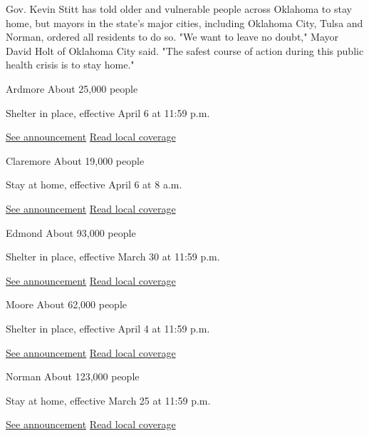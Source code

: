 Gov. Kevin Stitt has told older and vulnerable people across Oklahoma to
stay home, but mayors in the state's major cities, including Oklahoma
City, Tulsa and Norman, ordered all residents to do so. "We want to
leave no doubt," Mayor David Holt of Oklahoma City said. "The safest
course of action during this public health crisis is to stay home."

Ardmore About 25,000 people

Shelter in place, effective April 6 at 11:59 p.m.

\href{https://www.ardmorecity.org/DocumentCenter/View/2193/emergency-resolution?bidId=}{See
announcement} \textbar{}
\href{http://www.kten.com/story/41982515/ardmore-residents-ordered-to-shelter-in-place}{Read
local coverage}

Claremore About 19,000 people

Stay at home, effective April 6 at 8 a.m.

\href{https://www.claremorecity.com/DocumentCenter/View/4999/Emergency-Management-Order-3}{See
announcement} \textbar{}
\href{https://ktul.com/news/local/claremore-issues-stay-at-home-order}{Read
local coverage}

Edmond About 93,000 people

Shelter in place, effective March 30 at 11:59 p.m.

\href{http://edmondok.com/1568/COVID-19-Coronavirus-Information}{See
announcement} \textbar{}
\href{https://www.edmondsun.com/news/shelter-in-place-close-non-essential-businesses-in-edmond/article_9351d77a-72ec-11ea-baf9-efe3ccd9894e.html}{Read
local coverage}

Moore About 62,000 people

Shelter in place, effective April 4 at 11:59 p.m.

\href{https://www.cityofmoore.com/uploads/Parks/EMERGENCY-PROCLAMATION-00382020.pdf}{See
announcement} \textbar{}
\href{https://www.normantranscript.com/news/local_news/moore-issues-shelter-in-place-order-schools-update-distance-learning/article_e429efb1-025d-54ea-bc4c-d5afbcf1799f.html}{Read
local coverage}

Norman About 123,000 people

Stay at home, effective March 25 at 11:59 p.m.

\href{https://static1.squarespace.com/static/5e73c3526ab9182890fd4c29/t/5e7a745761495f27e26b1e5c/1585083479590/Proclamation+2020-04.pdf}{See
announcement} \textbar{}
\href{https://oklahoman.com/article/5658480/coronavirus-in-oklahoma-norman-mayor-to-announce-shelter-in-place-order}{Read
local coverage}

